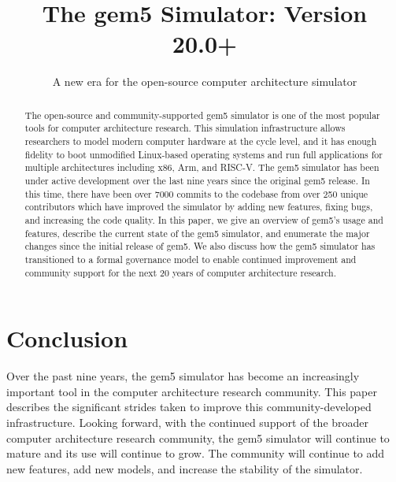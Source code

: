 \documentclass[sigconf,nonacm,screen=true]{acmart}
\begin{document}
\title{The gem5 Simulator: Version 20.0+}
\subtitle{A new era for the open-source computer architecture simulator}



\begin{abstract}
    The open-source and community-supported gem5 simulator is one of the most popular tools for computer architecture research.
    This simulation infrastructure allows researchers to model modern computer hardware at the cycle level, and it has enough fidelity to boot unmodified Linux-based operating systems and run full applications for multiple architectures including x86, Arm\textregistered, and RISC-V.
    The gem5 simulator has been under active development over the last nine years since the original gem5 release.
    In this time, there have been over 7000 commits to the codebase from over 250 unique contributors which have improved the simulator by adding new features, fixing bugs, and increasing the code quality.
    In this paper, we give an overview of gem5's usage and features, describe the current state of the gem5 simulator, and enumerate the major changes since the initial release of gem5.
    We also discuss how the gem5 simulator has transitioned to a formal governance model to enable continued improvement and community support for the next 20 years of computer architecture research.
\end{abstract}

\maketitle
\renewcommand{\shortauthors}{Lowe-Power and the gem5 Community}





\section{Conclusion}

Over the past nine years, the gem5 simulator has become an increasingly important tool in the computer architecture research community.
This paper describes the significant strides taken to improve this community-developed infrastructure.
Looking forward, with the continued support of the broader computer architecture research community, the gem5 simulator will continue to mature and its use will continue to grow.
The community will continue to add new features, add new models, and increase the stability of the simulator.
\end{document}
